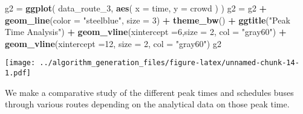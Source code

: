 \documentclass[
]{article}
\newenvironment{Shaded}{\begin{snugshade}}{\end{snugshade}}
\newcommand{\DataTypeTok}[1]{\textcolor[rgb]{0.13,0.29,0.53}{#1}}
\newcommand{\DecValTok}[1]{\textcolor[rgb]{0.00,0.00,0.81}{#1}}
\newcommand{\KeywordTok}[1]{\textcolor[rgb]{0.13,0.29,0.53}{\textbf{#1}}}
\newcommand{\NormalTok}[1]{#1}
\newcommand{\OperatorTok}[1]{\textcolor[rgb]{0.81,0.36,0.00}{\textbf{#1}}}
\newcommand{\StringTok}[1]{\textcolor[rgb]{0.31,0.60,0.02}{#1}}
\begin{document}
\begin{Shaded}
\begin{Highlighting}[]
\NormalTok{g2 =}\StringTok{ }\KeywordTok{ggplot}\NormalTok{(}
\NormalTok{  data_route_}\DecValTok{3}\NormalTok{,}
      \KeywordTok{aes}\NormalTok{(}
        \DataTypeTok{x =}\NormalTok{ time,}
        \DataTypeTok{y =}\NormalTok{ crowd}
\NormalTok{      )}
\NormalTok{) }
\NormalTok{g2 =}\StringTok{ }\NormalTok{g2 }\OperatorTok{+}\StringTok{ }\KeywordTok{geom_line}\NormalTok{(}\DataTypeTok{color =} \StringTok{"steelblue"}\NormalTok{, }\DataTypeTok{size =} \DecValTok{3}\NormalTok{) }\OperatorTok{+}\StringTok{ }\KeywordTok{theme_bw}\NormalTok{() }\OperatorTok{+}\StringTok{ }\KeywordTok{ggtitle}\NormalTok{(}\StringTok{"Peak Time Analysis"}\NormalTok{) }\OperatorTok{+}\StringTok{ }\KeywordTok{geom_vline}\NormalTok{(}\DataTypeTok{xintercept =}\DecValTok{6}\NormalTok{,}\DataTypeTok{size =} \DecValTok{2}\NormalTok{, }\DataTypeTok{col =} \StringTok{"gray60"}\NormalTok{) }\OperatorTok{+}\StringTok{ }\KeywordTok{geom_vline}\NormalTok{(}\DataTypeTok{xintercept =}\DecValTok{12}\NormalTok{, }\DataTypeTok{size =} \DecValTok{2}\NormalTok{, }\DataTypeTok{col =} \StringTok{"gray60"}\NormalTok{) }
\NormalTok{g2}
\end{Highlighting}
\end{Shaded}

\texttt{[image: ../algorithm\_generation\_files/figure-latex/unnamed-chunk-14-1.pdf]}

We make a comparative study of the different peak times and schedules
buses through various routes depending on the analytical data on those
peak time.
\end{document}
